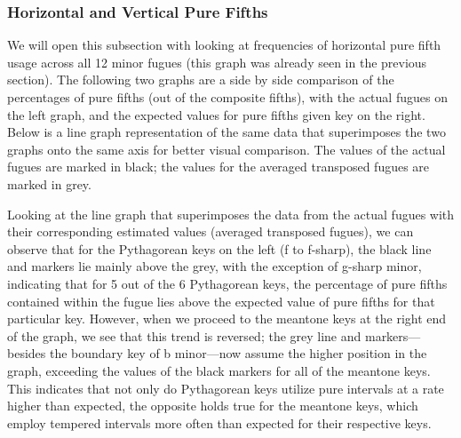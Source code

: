\subsubsection{Horizontal and Vertical Pure
Fifths}\label{horizontal-and-vertical-pure-fifths}

We will open this subsection with looking at frequencies of horizontal
pure fifth usage across all 12 minor fugues (this graph was already seen
in the previous section). The following two graphs are a side by side
comparison of the percentages of pure fifths (out of the composite
fifths), with the actual fugues on the left graph, and the expected
values for pure fifths given key on the right. Below is a line graph
representation of the same data that superimposes the two graphs onto
the same axis for better visual comparison. The values of the actual
fugues are marked in black; the values for the averaged transposed
fugues are marked in grey.


    \begin{center}
    \end{center}
    


    \begin{center}
    \end{center}
    
    Looking at the line graph that superimposes the data from the actual
fugues with their corresponding estimated values (averaged transposed
fugues), we can observe that for the Pythagorean keys on the left (f to
f-sharp), the black line and markers lie mainly above the grey, with the
exception of g-sharp minor, indicating that for 5 out of the 6
Pythagorean keys, the percentage of pure fifths contained within the
fugue lies above the expected value of pure fifths for that particular
key. However, when we proceed to the meantone keys at the right end of
the graph, we see that this trend is reversed; the grey line and
markers---besides the boundary key of b minor---now assume the
higher position in the graph, exceeding the values of the black markers
for all of the meantone keys. This indicates that not only do
Pythagorean keys utilize pure intervals at a rate higher than expected,
the opposite holds true for the meantone keys, which employ tempered
intervals more often than expected for their respective keys.

